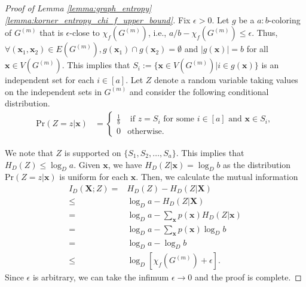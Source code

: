 \documentclass[journal, onecolumn, draftcls]{IEEEtran}
\theoremstyle{definition}
\newcommand{\bfX}{\mathbf{X}}
\newcommand{\bfx}{\mathbf{x}}
\begin{document}


\begin{proof}[Proof of  Lemma \ref{lemma:graph_entropy}   \ref{lemma:korner_entropy_chi_f_upper_bound}]
Fix  $\epsilon>0$. Let  $g$ be a $a:b$-coloring of $G^{(m)}$ that is $\epsilon$-close to $\chi_f(G^{(m)})$, i.e., $a/b-\chi_f(G^{(m)})\le \epsilon$. Thus, $\forall (\bfx_1,\bfx_2)\in E(G^{(m)}), g(\bfx_1)\cap g(\bfx_2) = \emptyset$ and $|g(\bfx)| = b$ for all $\bfx \in V(G^{(m)})$. This implies that   $S_i:=\{\bfx\in V(G^{(m)})|i\in g(\bfx)\}$ is an independent set for each $i\in [a]$. Let $Z$ denote a random variable taking values on the independent sets in $G^{(m)}$ and consider the following conditional distribution.
\begin{align}
    \text{Pr}(Z = z|\bfx) &= \begin{cases}
        \frac{1}{b} & \text{~if~} z = S_i \text{~for some~} i \in [a] \text{~and~} \bfx \in S_i,\\
        0 & \text{otherwise.}
        \end{cases}
\end{align}

We note that $Z$ is supported on $\{S_1,S_2,\dots, S_a\}$. This implies that $H_D(Z)\le \log_Da$. Given $\bfx$, we have $    H_D(Z|\bfx) = \log_D b$ as the distribution $\text{Pr}(Z = z|\bfx)$ is uniform for each $\bfx$. Then, we calculate the mutual information
\begin{align*}
    I_D(\bfX;Z) =& H_D(Z)-H_D(Z|\bfX)\\
    \le & \log_D a -H_D(Z|\bfX)\\
    = & \log_D a -\sum_{\bfx}p(\bfx)H_D(Z|\bfx)\\
    = & \log_D a -\sum_{\bfx}p(\bfx)\log_D b\\
    =& \log_D a -\log_D b\\ 
    \le &\log_D [\chi_f(G^{(m)}) + \epsilon].
\end{align*}
Since $\epsilon$ is arbitrary, we can take the infimum $\epsilon\to 0$ and the proof is complete.
\end{proof} 
\end{document}
